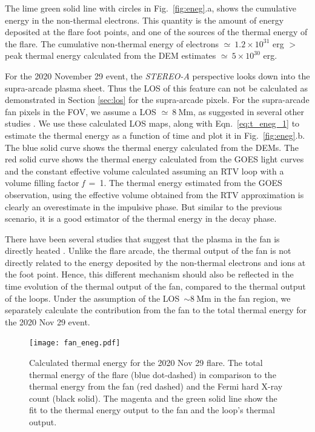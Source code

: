 The lime green solid line with circles in Fig.~\ref{fig:eneg}.a, shows the cumulative energy in the non-thermal electrons. This quantity is the amount of energy deposited at the flare foot points, and one of the sources of the thermal energy of the flare. The cumulative non-thermal energy of electrons $\simeq~1.2\times 10^{31}$ erg $>$ peak thermal energy calculated from the DEM estimates $\simeq~5\times 10^{30}$ erg.

For the 2020 November 29 event, the {\it STEREO-A} perspective looks down into the supra-arcade plasma sheet. Thus the LOS of this feature can not be calculated as demonstrated in Section \ref{sec:los} for the supra-arcade pixels. For the supra-arcade fan pixels in the FOV, we assume a LOS $\simeq~8~\textrm{Mm}$, as suggested in several other studies \citep[see e.g.,][]{savage10,seaton17,li18}. We use these calculated LOS maps, along with Eqn.~\ref{eq:t_eneg_1} to estimate the thermal energy as a function of time and plot it in Fig.~\ref{fig:eneg}.b. The blue solid curve shows the thermal energy calculated from the DEMs. The red solid curve shows the thermal energy calculated from the GOES light curves and the constant effective volume calculated assuming an RTV loop with a volume filling factor \textit{f}~=~1. The thermal energy estimated from the GOES observation, using the effective volume obtained from the RTV approximation is clearly an overestimate in the impulsive phase. But similar to the previous scenario, it is a good estimator of the thermal energy in the decay phase.

There have been several studies that suggest that the plasma in the fan is directly heated \citep{hanneman14,chen17,reeves17,warren18,cai22,xie23}. Unlike the flare arcade, the thermal output of the fan is not directly related to the energy deposited by the non-thermal electrons and ions at the foot point. Hence, this different mechanism should also be reflected in the time evolution of the thermal output of the fan, compared to the thermal output of the loops. Under the assumption of the LOS~$\mathrm{\sim 8~Mm}$ in the fan region, we separately calculate the contribution from the fan to the total thermal energy for the 2020 Nov 29 event.

\begin{figure}[ht!]
    \centering
    \texttt{[image: fan\_eneg.pdf]}
    \caption[Calculated thermal energy for the loops and the fan for the November 29th, 2020 flare.]{Calculated thermal energy for the 2020 Nov 29 flare. The total thermal energy of the flare (blue dot-dashed) in comparison to the thermal energy from the fan (red dashed) and the Fermi hard X-ray count (black solid). The magenta and the green solid line show the fit to the thermal energy output to the fan and the loop's thermal output.}
    \label{fig:fan_eneg}
    \end{figure}


